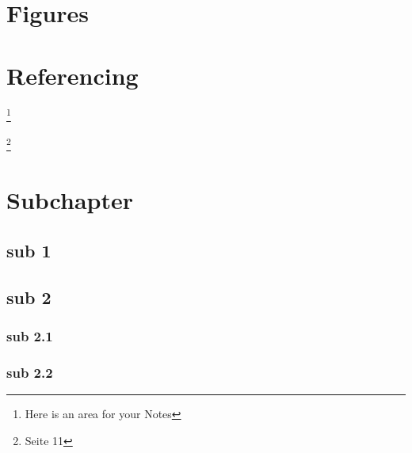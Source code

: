 \documentclass[a4paper, 12pt, oneside, BCOR1cm,toc=chapterentrywithdots]{scrbook}
\begin{document}
\chapter{Figures}

\chapter{Referencing}

\blindtext \cite{autorenrichtlinien}

\blindtext \footnote{Here is an area for your Notes}

\blindtext \footnote{\cite{lnilatex} Seite 11}
\blindtext \cite{lnilatex}
\blindtext \cite{autorenrichtlinien,pepper1992grundlagen,chen2001audiovisual}


\chapter{Subchapter}

\section{sub 1}
\blindtext[3]
\section{sub 2}
\blindtext[3]
\subsection{sub 2.1}
\blindtext[3]

\subsection{sub 2.2}
\blindtext[3]





\printindex
\end{document}
